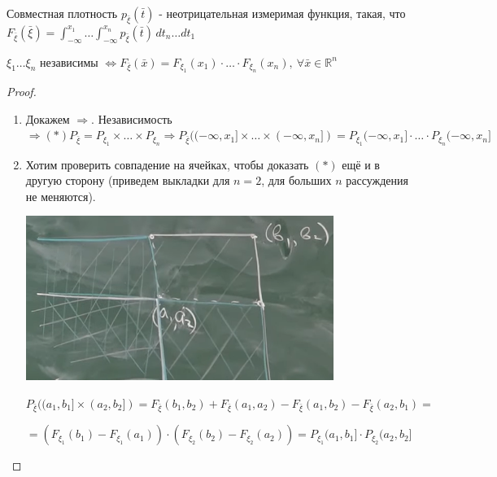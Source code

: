 \begin{definition}
    Совместная плотность $p_{\bar{\xi}} (\bar{t})$ - неотрицательная измеримая функция, такая, что $F_{\bar{\xi}} (\bar{\xi}) = \int_{-\infty}^{x_1} \ldots \int_{-\infty}^{x_n} p_{\bar{\xi}} (\bar{t}) \, dt_n \ldots dt_1$
\end{definition}

\begin{theorem}
    $\xi_1 \ldots \xi_n$ независимы $\Longleftrightarrow F_{\bar{\xi}} (\bar{x}) = F_{\xi_1} (x_1) \cdot \ldots \cdot F_{\xi_n} (x_n), \ \forall \bar{x} \in \mathbb{R}^n$
\end{theorem}

\begin{proof}
    \begin{enumerate}
        \item {
            Докажем $\Rightarrow$. Независимость $\Rightarrow (*) P_{\bar{\xi}} = P_{\xi_1} \times \ldots \times P_{\xi_n} \Rightarrow
            P_{\bar{\xi}} ((-\infty, x_1] \times \ldots \times (-\infty, x_n]) = P_{\xi_1} (-\infty, x_1] \cdot \ldots \cdot P_{\xi_n} (-\infty, x_n]$
        }
        \item {
            Хотим проверить совпадение на ячейках, чтобы доказать $(*)$ ещё и в другую сторону (приведем выкладки для $n=2$, для больших $n$ рассуждения не меняются).

            \begin{center}
                \includegraphics[width=10cm]{assets/02-general-prob-theory/arbitrary-value-independence.png}
            \end{center}

            $P_{\bar{\xi}}((a_1, b_1] \times (a_2, b_2]) = F_{\bar{\xi}} (b_1, b_2)  + F_{\bar{\xi}} (a_1, a_2) - F_{\bar{\xi}} (a_1, b_2) - F_{\bar{\xi}} (a_2, b_1) =$

            $= (F_{\xi_1} (b_1) - F_{\xi_1}(a_1)) \cdot (F_{\xi_2}(b_2) - F_{\xi_2}(a_2)) = P_{\xi_1} (a_1, b_1] \cdot P_{\xi_2}(a_2, b_2]$
        }
    \end{enumerate}
\end{proof}

